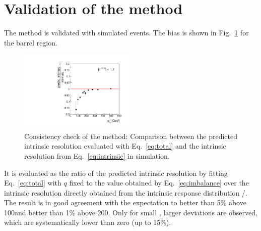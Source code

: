 \section{Validation of the method}
The method is validated with simulated events. 
The bias  is shown in Fig.~\ref{fig:MCClosure} for the barrel region. 
\begin{figure}[t]
  \centering
    \includegraphics[width=0.49\textwidth]{figures/resolution/methodology/MCClosure_for_1_eta_bin_RMS99_barrel_0p2range.pdf}
  \caption{Consistency check of the method: Comparison between the predicted intrinsic resolution evaluated with Eq.~\eqref{eq:total} and the intrinsic resolution from Eq.~\eqref{eq:intrinsic} in simulation.}  
  \label{fig:MCClosure}
\end{figure}
It is evaluated as the ratio of the predicted intrinsic resolution by fitting Eq.~\eqref{eq:total} with $q$ fixed to the value obtained by Eq.~\eqref{eq:imbalance} over the intrinsic resolution directly obtained from the intrinsic response distribution \ptrecojet/\ptgenjet.
The result is in good agreement with the expectation to better than 5\% above 100\gev and better than 1\% above 200\gev.
Only for small \pt, larger deviations are observed, which are systematically lower than zero (up to 15\%).


